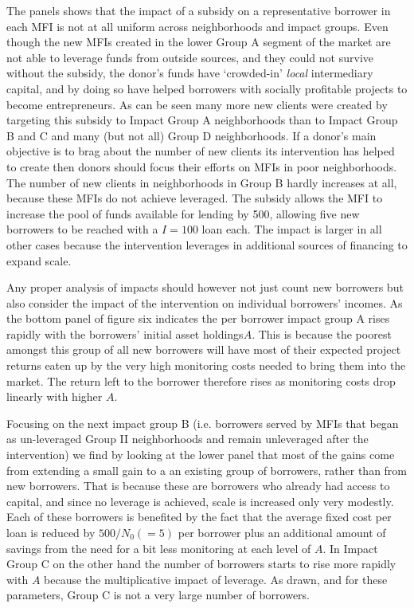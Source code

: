 \documentclass[letterpaper, 12pt]{article}
\begin{document}
The panels shows that the impact of a subsidy on a representative
borrower in each MFI is not at all uniform across neighborhoods and
impact groups. Even though the new MFIs created in the lower Group A
segment of the market are not able to leverage funds from outside
sources, and they could not survive without the subsidy, the donor's
funds have `crowded-in' \emph{local} intermediary capital, and by doing
so have helped borrowers with socially profitable projects to become
entrepreneurs. As can be seen many more new clients were created by
targeting this subsidy to Impact Group A neighborhoods than to Impact
Group B and C and many (but not all) Group D neighborhoods. If a donor's
main objective is to brag about the number of new clients its
intervention has helped to create then donors should focus their efforts
on MFIs in poor neighborhoods. The number of new clients in
neighborhoods in Group B hardly increases at all, because these MFIs do
not achieve leveraged. The subsidy allows the MFI to increase the pool
of funds available for lending by 500, allowing five new borrowers to be
reached with a \(I = 100\) loan each. The impact is larger in all other
cases because the intervention leverages in additional sources of
financing to expand scale.

Any proper analysis of impacts should however not just count new
borrowers but also consider the impact of the intervention on individual
borrowers' incomes. As the bottom panel of figure six indicates the per
borrower impact group A rises rapidly with the borrowers' initial asset
holdings\(A\). This is because the poorest amongst this group of all new
borrowers will have most of their expected project returns eaten up by
the very high monitoring costs needed to bring them into the market. The
return left to the borrower therefore rises as monitoring costs drop
linearly with higher \(A\).

Focusing on the next impact group B (i.e. borrowers served by MFIs that
began as un-leveraged Group II neighborhoods and remain unleveraged
after the intervention) we find by looking at the lower panel that most
of the gains come from extending a small gain to a an existing group of
borrowers, rather than from new borrowers. That is because these are
borrowers who already had access to capital, and since no leverage is
achieved, scale is increased only very modestly. Each of these borrowers
is benefited by the fact that the average fixed cost per loan is reduced
by \(500/N_{0}( = 5)\) per borrower plus an additional amount of savings
from the need for a bit less monitoring at each level of \(A\). In
Impact Group C on the other hand the number of borrowers starts to rise
more rapidly with \(A\) because the multiplicative impact of leverage.
As drawn, and for these parameters, Group C is not a very large number
of borrowers.
\end{document}
